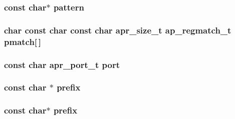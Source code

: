 \subsubsection[{\texorpdfstring{pattern}{pattern}}]{\setlength{\rightskip}{0pt plus 5cm}const char$\ast$ pattern}\hypertarget{group__APACHE__CORE__DAEMON_gacd28ae39c6440992e47d3da772c56602}{}\label{group__APACHE__CORE__DAEMON_gacd28ae39c6440992e47d3da772c56602}
\subsubsection[{\texorpdfstring{pmatch}{pmatch}}]{\setlength{\rightskip}{0pt plus 5cm}char const char const char {\bf apr\+\_\+size\+\_\+t} {\bf ap\+\_\+regmatch\+\_\+t} pmatch\mbox{[}$\,$\mbox{]}}\hypertarget{group__APACHE__CORE__DAEMON_gaa84c3b7a465311cc04c25e4998c81aec}{}\label{group__APACHE__CORE__DAEMON_gaa84c3b7a465311cc04c25e4998c81aec}
\subsubsection[{\texorpdfstring{port}{port}}]{\setlength{\rightskip}{0pt plus 5cm}const char {\bf apr\+\_\+port\+\_\+t} port}\hypertarget{group__APACHE__CORE__DAEMON_ga225c76c246a5cc263c5a2628eb99353e}{}\label{group__APACHE__CORE__DAEMON_ga225c76c246a5cc263c5a2628eb99353e}
\subsubsection[{\texorpdfstring{prefix}{prefix}}]{\setlength{\rightskip}{0pt plus 5cm}const char $\ast$ prefix}\hypertarget{group__APACHE__CORE__DAEMON_gab3ec82a7f3a54026d495e065c942b3b3}{}\label{group__APACHE__CORE__DAEMON_gab3ec82a7f3a54026d495e065c942b3b3}
\subsubsection[{\texorpdfstring{prefix}{prefix}}]{\setlength{\rightskip}{0pt plus 5cm}const char$\ast$ prefix}\hypertarget{group__APACHE__CORE__DAEMON_ga5b41c5ae4505891e6c53e26df197e02b}{}\label{group__APACHE__CORE__DAEMON_ga5b41c5ae4505891e6c53e26df197e02b}
